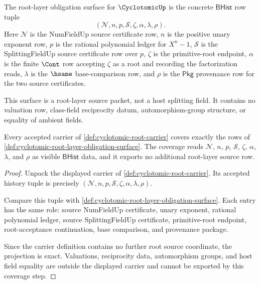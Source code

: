 \begin{definition}
\label{def:cyclotomic-root-layer-obligation-surface}
The root-layer obligation surface for $\CyclotomicUp$ is the concrete
$\mathsf{BHist}$ row tuple
$$
(\mathcal{N}, n, p, \mathcal{S}, \zeta, \alpha, \lambda, \rho).
$$
Here $\mathcal{N}$ is the NumFieldUp source certificate row, $n$ is the positive
unary exponent row, $p$ is the rational polynomial ledger for $X^n-1$,
$\mathcal{S}$ is the SplittingFieldUp source certificate row over $p$, $\zeta$
is the primitive-root endpoint, $\alpha$ is the finite $\Cont$ row accepting
$\zeta$ as a root and recording the factorization reads, $\lambda$ is the
$\hsame$ base-comparison row, and $\rho$ is the $\mathsf{Pkg}$ provenance row for
the two source certificates.

This surface is a root-layer source packet, not a host splitting field. It
contains no valuation row, class-field reciprocity datum, automorphism-group
structure, or equality of ambient fields.
\end{definition}

\begin{theorem}
\label{thm:cyclotomic-root-layer-source-coverage}
Every accepted carrier of \autoref{def:cyclotomic-root-carrier} covers exactly
the rows of \autoref{def:cyclotomic-root-layer-obligation-surface}. The coverage
reads $\mathcal{N}$, $n$, $p$, $\mathcal{S}$, $\zeta$, $\alpha$, $\lambda$, and
$\rho$ as visible $\mathsf{BHist}$ data, and it exports no additional
root-layer source row.
\end{theorem}
\begin{proof}
Unpack the displayed carrier of \autoref{def:cyclotomic-root-carrier}. Its
accepted history tuple is precisely
$(\mathcal{N}, n, p, \mathcal{S}, \zeta, \alpha, \lambda, \rho)$.

Compare this tuple with
\autoref{def:cyclotomic-root-layer-obligation-surface}. Each entry has the same
role: source NumFieldUp certificate, unary exponent, rational polynomial ledger,
source SplittingFieldUp certificate, primitive-root endpoint, root-acceptance
continuation, base comparison, and provenance package.

Since the carrier definition contains no further root source coordinate, the
projection is exact. Valuations, reciprocity data, automorphism groups, and host
field equality are outside the displayed carrier and cannot be exported by this
coverage step.
\end{proof}

